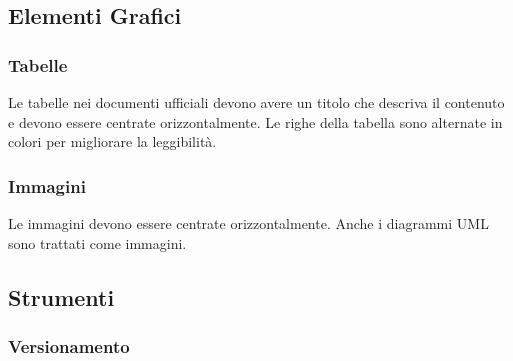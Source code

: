 \subsection{Elementi Grafici}

\subsubsection{Tabelle}
Le tabelle nei documenti ufficiali devono avere un titolo che descriva il contenuto e devono essere centrate orizzontalmente. 
Le righe della tabella sono alternate in colori per migliorare la leggibilità. 

\subsubsection{Immagini}
Le immagini devono essere centrate orizzontalmente. Anche i diagrammi UML sono trattati come immagini.

\subsection{Strumenti}

\subsubsection{Versionamento}
